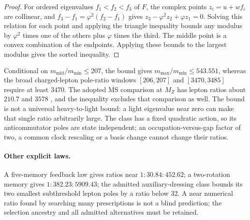 \documentclass[11pt]{article}
\begin{document}
\begin{proof}
For ordered eigenvalues \(f_1<f_2<f_3\) of \(F\), the complex points
\(z_i=u+wf_i\) are collinear, and \(f_3-f_1=\varphi^2(f_2-f_1)\) gives
\(z_3-\varphi^2z_2+\varphi z_1=0\). Solving this relation for each point and
applying the triangle inequality bounds any modulus by \(\varphi^2\) times
one of the others plus \(\varphi\) times the third. The middle point is a
convex combination of the endpoints. Applying these bounds to the largest
modulus gives the sorted inequality.
\end{proof}

Conditional on \(m_{\mathrm{mid}}/m_{\min}\le207\), the bound gives
\(m_{\max}/m_{\min}\le543.551\), whereas the broad charged-lepton pole-ratio
windows \([206,207]\) and \([3470,3485]\) require at least \(3470\). The
adopted \(\overline{\mathrm{MS}}\) comparison at \(M_Z\) has lepton ratios
about \(210.7\) and \(3578\) \cite{antusch2025running}, and the inequality
excludes that comparison as well. The bound is not a universal heavy-to-light
bound: a light eigenvalue near zero can make that single ratio arbitrarily
large. The class has a fixed quadratic action, so its anticommutator poles
are state independent; an occupation-versus-gap factor of two, a common
clock rescaling or a basis change cannot change their ratios.

\paragraph{Other explicit laws.}
A five-memory feedback law gives ratios near \(1:30.84:452.62\); a
two-rotation memory gives \(1:382.23:5909.43\); the admitted
auxiliary-dressing class bounds its two smallest subthreshold lepton poles by
a ratio below 32. A near numerical ratio found by searching many
prescriptions is not a blind prediction; the selection ancestry and all
admitted alternatives must be retained.
\end{document}
